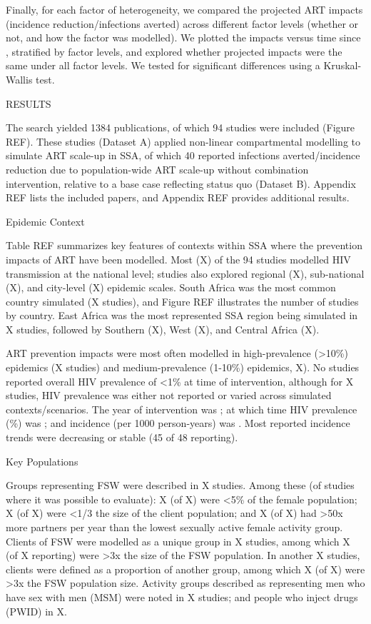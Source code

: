 Finally, for each factor of heterogeneity,
we compared the projected ART impacts (incidence reduction/infections averted)
across different factor levels (whether or not, and how the factor was modelled).
We plotted the impacts versus time since , stratified by factor levels,
and explored whether projected impacts were the same under all factor levels.
We tested for significant differences using a Kruskal-Wallis test.

RESULTS

The search yielded 1384 publications,
of which 94 studies were included (Figure REF).
These studies (Dataset A) applied non-linear compartmental modelling to simulate ART scale-up in SSA,
of which 40 reported infections averted/incidence reduction
due to population-wide ART scale-up without combination intervention,
relative to a base case reflecting status quo (Dataset B).
Appendix REF lists the included papers, and
Appendix REF provides additional results.

Epidemic Context

Table REF summarizes key features of contexts within SSA
where the prevention impacts of ART have been modelled.
Most (X) of the 94 studies modelled HIV transmission at the national level;
studies also explored
regional (X),
sub-national (X), and
city-level (X) epidemic scales.
South Africa was the most common country simulated (X studies), and
Figure REF illustrates the number of studies by country.
East Africa was the most represented SSA region being simulated in X studies,
followed by Southern (X), West (X), and Central Africa (X).

ART prevention impacts were most often modelled in
high-prevalence ({>10\%}) epidemics (X studies) and
medium-prevalence ({1-10\%}) epidemics, X).
No studies reported overall HIV prevalence of {<1\%} at time of intervention,
although for X studies, HIV prevalence was either
not reported or varied across simulated contexts/scenarios.
The \xdmdef year of intervention was ; at which time
HIV prevalence (\%) was ; and
incidence (per 1000 person-years) was .
Most reported incidence trends were decreasing or stable (45 of 48 reporting). 

Key Populations

Groups representing FSW were described in X studies.
Among these (of studies where it was possible to evaluate):
X (of X) were {<5\%} of the female population;
X (of X) were {<1/3} the size of the client population; and
X (of X) had {>50x} more partners per year than
the lowest sexually active female activity group.
Clients of FSW were modelled as a unique group in X studies,
among which X (of X reporting)
were {>3x} the size of the FSW population.
In another X studies, clients were defined as a proportion of another group,
among which X (of X)
were {>3x} the FSW population size.
Activity groups described as representing
men who have sex with men (MSM) were noted in X studies; and
people who inject drugs (PWID) in X.


